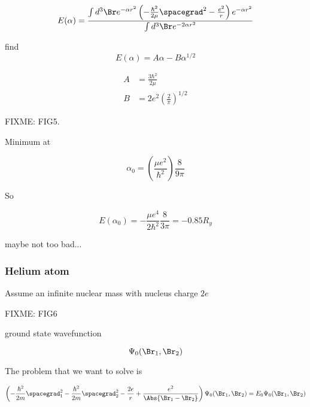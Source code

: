 \begin{equation}\label{eqn:qmTwoL2:390}
E(\alpha) =
\frac{\int d^3 \Br e^{-\alpha r^2} \left( -\frac{\hbar^2}{2 \mu} \spacegrad^2 - \frac{e^2}{r} \right) e^{-\alpha r^2}}{
\int d^3\Br e^{-2 \alpha r^2}
}
\end{equation}

find
\begin{equation}\label{eqn:qmTwoL2:410}
E(\alpha) = A \alpha - B \alpha^{1/2}
\end{equation}

\begin{align}\label{eqn:qmTwoL2:430}
A &= \frac{3 \hbar^2}{2\mu} \\
B &= 2 e^2 \left( \frac{2}{\pi} \right)^{1/2}
\end{align}

FIXME: FIG5.

Minimum at

\begin{equation}\label{eqn:qmTwoL2:450}
\alpha_0 =
\left( \frac{\mu e^2}{ \hbar^2 } \right) \frac{8 }{9 \pi}
\end{equation}

So

\begin{equation}\label{eqn:qmTwoL2:470}
E(\alpha_0) =
- \frac{\mu e^4 }{2 \hbar^2} \frac{8 }{3 \pi} = -0.85 R_y
\end{equation}

maybe not too bad...

\subsubsection{Helium atom}

Assume an infinite nuclear mass with nucleus charge $2 e$

FIXME: FIG6

ground state wavefunction

\begin{equation}\label{eqn:qmTwoL2:490}
\Psi_0(\Br_1, \Br_2)
\end{equation}

The problem that we want to solve is

\begin{equation}\label{eqn:qmTwoL2:510}
\left(
-\frac{\hbar^2}{2 m} \spacegrad_1^2
-\frac{\hbar^2}{2 m} \spacegrad_2^2
- \frac{2 e}{r}
+
\frac{e^2}{\Abs{\Br_1 - \Br_2}}
\right)
\Psi_0(\Br_1, \Br_2) = E_0 \Psi_0(\Br_1, \Br_2)
\end{equation}

